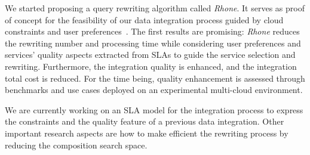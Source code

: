 We started proposing a query rewriting algorithm called \textit{Rhone}. It serves as proof of concept for the feasibility of our data integration process guided by cloud constraints and user preferences~\cite{carvalho2016}. The first results are promising: \textit{Rhone} reduces the rewriting number and processing time while considering user preferences and services' quality aspects extracted from SLAs to guide the service selection and rewriting. Furthermore, the integration quality is enhanced, and the integration total cost is reduced. For the time being, quality enhancement is  assessed through benchmarks and use cases deployed on an experimental multi-cloud environment. 

We are currently working on an SLA model for the integration process to express the constraints and the quality feature of a previous data integration. %
Other important research aspects are how to make efficient the rewriting process by reducing the composition search space. 